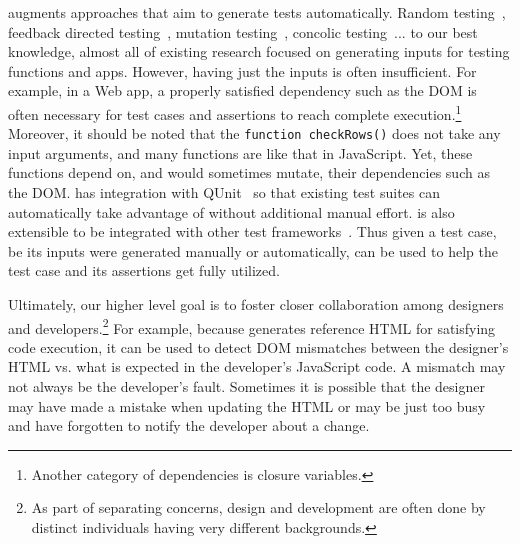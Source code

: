 \tool augments approaches that aim to generate tests automatically.  
Random testing~\cite{}, feedback directed testing~\cite{}, mutation testing~\cite{}, concolic testing~\cite{}... to our best knowledge, almost all of existing research focused on generating inputs for testing functions and apps.
However, having just the inputs is often insufficient.  For example, in a Web app, a properly satisfied dependency such as the DOM is often necessary for test cases and assertions to reach complete execution.\footnote{Another category of dependencies is closure variables.}
Moreover, it should be noted that the {\tt function checkRows()} does not take any input arguments, and many functions are like that in JavaScript.
Yet, these functions depend on, and would sometimes mutate, their dependencies such as the DOM.
\tool has integration with QUnit~\cite{qunit} so that existing test suites can automatically take advantage of \tool without additional manual effort.  \tool is also extensible to be integrated with other test frameworks~\cite{jstests}.
Thus given a test case, be its inputs were generated manually or automatically, \tool can be used to help the test case and its assertions get fully utilized.

Ultimately, our higher level goal is to foster closer collaboration among designers and developers.\footnote{As part of separating concerns, design and development are often done by distinct individuals having very different backgrounds.}
For example, because \tool generates reference HTML for satisfying code execution, it can be used to detect DOM mismatches between the designer's HTML vs. what is expected in the developer's JavaScript code.
A mismatch may not always be the developer's fault.  Sometimes it is possible that the designer may have made a mistake when updating the HTML or may be just too busy and have forgotten to notify the developer about a change.

